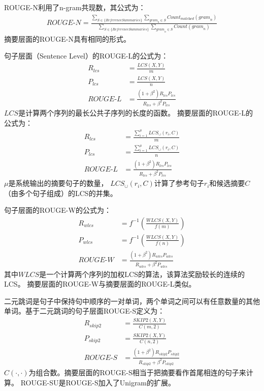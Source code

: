 ROUGE-N利用了n-gram共现数，其公式为：
\begin{align}
    \textit{ROUGE-N} = \frac{
    \sum_{S \in \{\textit{ReferenceSummaries}\}}
    \sum_{\textit{gram}_n \in S}
    \textit{Count}_\textit{matched}(\textit{gram}_n)
    }{
    \sum_{S \in \{\textit{ReferenceSummaries}\}}
    \sum_{\textit{gram}_n \in S}
    \textit{Count}(\textit{gram}_n)
    }
\end{align}
摘要层面的ROUGE-N具有相同的形式。

句子层面（Sentence Level）的ROUGE-L的公式为：
\begin{align}
    R_{lcs} &= \frac{\textit{LCS}(X, Y)}{m} \\
    P_{lcs} &= \frac{\textit{LCS}(X, Y)}{n} \\
    \textit{ROUGE-L} &= \frac{(1 + \beta^2) R_{lcs}P_{lcs}}
    {R_{lcs} + \beta^2 P_{lcs}}
\end{align}
$LCS$是计算两个序列的最长公共子序列的长度的函数。
摘要层面的ROUGE-L的公式为：
\begin{align}
    R_{lcs} &= \frac{\sum_{i=1}^\mu \textit{LCS}_\cup(r_i, C)}{m} \\
    P_{lcs} &= \frac{\sum_{i=1}^\mu \textit{LCS}_\cup(r_i, C)}{n} \\
    \textit{ROUGE-L} &= \frac{(1 + \beta^2) R_{lcs}P_{lcs}}{R_{lcs} + \beta^2 P_{lcs}}
\end{align}
$\mu$是系统输出的摘要句子的数量， $\textit{LCS}_\cup(r_i, C)$计算了参考句子$r_i$和候选摘要$C$（由多个句子组成）的LCS的并集。

句子层面的ROUGE-W的公式为：
\begin{align}
    R_{wlcs} &= f^{-1} \left( \frac{\textit{WLCS}(X, Y)}{f(m)} \right) \\
    P_{wlcs} &= f^{-1} \left( \frac{\textit{WLCS}(X, Y)}{f(n)} \right) \\
    \textit{ROUGE-W} &= \frac{(1 + \beta^2) R_{wlcs}P_{wlcs}}{R_{wlcs} + \beta^2 P_{wlcs}}
\end{align}
其中$\textit{WLCS}$是一个计算两个序列的加权LCS的算法，该算法奖励较长的连续的LCS。
摘要层面的ROUGE-W与摘要层面的ROUGE-L类似。

二元跳词是句子中保持句中顺序的一对单词，两个单词之间可以有任意数量的其他单词。基于二元跳词的句子层面ROUGE-S定义为：
\begin{align}
    R_{skip2} &= \frac{\textit{SKIP2}(X, Y)}{C(m, 2)} \\
    P_{skip2} &= \frac{\textit{SKIP2}(X, Y)}{C(n, 2)} \\
    \textit{ROUGE-S} &= \frac{(1 + \beta^2) R_{skip2}P_{skip2}}{R_{skip2} + \beta^2 P_{skip2}}
\end{align}
$C(\cdot, \cdot)$为组合数。摘要层面的ROUGE-S相当于把摘要看作首尾相连的句子来计算。
ROUGE-SU是ROUGE-S加入了Unigram的扩展。

